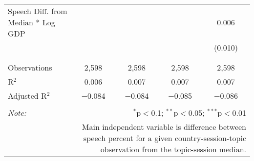 \begin{table}[!htbp]
\begin{tabular}{@{\extracolsep{5pt}}lcccc}
 Speech Diff. from Median * Log GDP &  &  &  & 0.006 \\ 
  &  &  &  & (0.010) \\ 
  & & & & \\ 
\hline \\[-1.8ex] 
Observations & 2,598 & 2,598 & 2,598 & 2,598 \\ 
R$^{2}$ & 0.006 & 0.007 & 0.007 & 0.007 \\ 
Adjusted R$^{2}$ & $-$0.084 & $-$0.084 & $-$0.085 & $-$0.086 \\ 
\hline 
\hline \\[-1.8ex] 
\textit{Note:}  & \multicolumn{4}{r}{$^{*}$p$<$0.1; $^{**}$p$<$0.05; $^{***}$p$<$0.01} \\ 
 & \multicolumn{4}{r}{Main independent variable is difference between speech percent for a given country-session-topic observation from the topic-session median.} \\ 
\end{tabular} 
\end{table} 
